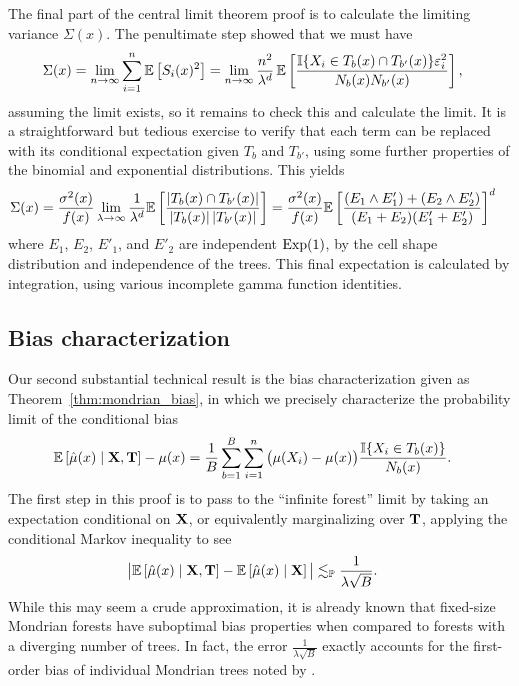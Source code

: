 The final part of the central limit theorem proof is to calculate the limiting
variance $\Sigma(x)$. The penultimate step showed that we must have
%
\begin{align*}
  \Sigma(x)
  &= \lim_{n \to \infty} \sum_{i=1}^n \mathbb{E} \left[S_i(x)^2 \right]
  = \lim_{n \to \infty}
  \frac{n^2}{\lambda^d} \,
  \mathbb{E} \left[
    \frac{\mathbb{I}\{X_i \in T_b(x) \cap T_{b'}(x)\} \varepsilon_i^2}
    {N_{b}(x) N_{b'}(x)}
  \right],
\end{align*}
%
assuming the limit exists, so it remains to check this and calculate the limit.
It is a straightforward but tedious exercise to verify that each term can be
replaced with its conditional expectation given $T_b$ and $T_{b'}$, using some
further properties of the binomial and exponential distributions. This yields
%
\begin{align*}
  \Sigma(x)
  &=
  \frac{\sigma^2(x)}{f(x)}
  \lim_{\lambda \to \infty}
  \frac{1}{\lambda^d}
  \mathbb{E} \left[
    \frac{|T_{b}(x) \cap T_{b'}(x)|}
    {|T_{b}(x)| \, |T_{b'}(x)|}
  \right]
  = \frac{\sigma^2(x)}{f(x)}
  \mathbb{E} \left[
    \frac{(E_{1} \wedge E'_{1}) + (E_{2} \wedge E'_{2})}
    {(E_{1} + E_{2}) (E'_{1} + E'_{2})}
  \right]^d
\end{align*}
%
where $E_1$, $E_2$, $E'_1$, and $E'_2$ are independent $\operatorname{Exp}(1)$,
by the cell shape distribution and independence of the trees. This final
expectation is calculated by integration, using various incomplete gamma
function identities.

\subsection*{Bias characterization}

Our second substantial technical result is the bias characterization
given as Theorem~\ref{thm:mondrian_bias}, in which we precisely
characterize the probability limit of the conditional bias
%
\begin{align*}
  \mathbb{E} \left[ \hat \mu(x) \mid \mathbf{X}, \mathbf{T} \right]
  - \mu(x)
  &=
  \frac{1}{B} \sum_{b=1}^B
  \sum_{i=1}^n \big( \mu(X_i) - \mu(x) \big)
  \frac{\mathbb{I}\{X_i \in T_b(x)\}}{N_b(x)}.
\end{align*}
%
The first step in this proof is to pass to the ``infinite forest''
limit by taking an expectation conditional on $\mathbf{X}$, or equivalently
marginalizing over $\mathbf{T}$, applying the conditional Markov inequality
to see
%
\begin{align*}
  \big|
  \mathbb{E} \left[ \hat \mu(x) \mid \mathbf{X}, \mathbf{T} \right]
  - \mathbb{E} \left[ \hat \mu(x) \mid \mathbf{X} \right]
  \big|
  &\lesssim_{\mathbb{P}}
  \frac{1}{\lambda \sqrt B}.
\end{align*}
%
While this may seem a crude approximation, it is already known that fixed-size
Mondrian forests have suboptimal bias properties when compared to forests with
a diverging number of trees. In fact, the error $\frac{1}{\lambda \sqrt B}$
exactly accounts for the first-order bias of individual Mondrian trees noted by
\citet{mourtada2020minimax}.

